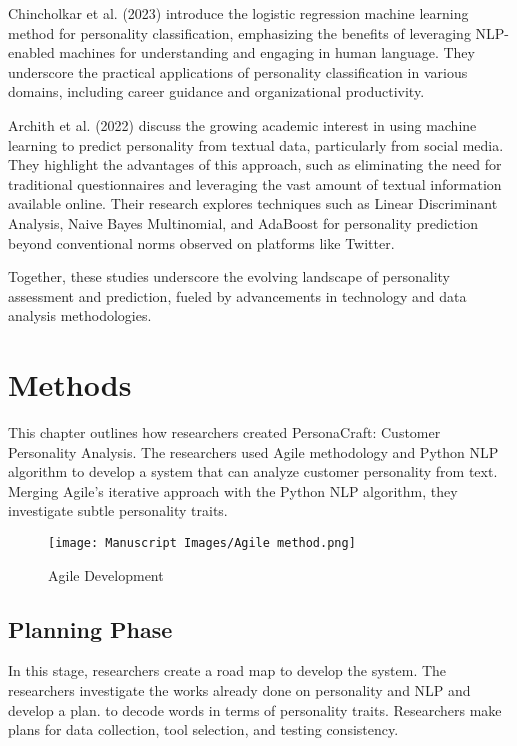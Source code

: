 \documentclass[conference]{IEEEtran}
\begin{document}
    Chincholkar et al. (2023) introduce the logistic regression machine learning method for personality
    classification, emphasizing the benefits of leveraging NLP-enabled machines for understanding
    and engaging in human language. They underscore the practical applications of personality classification
    in various domains, including career guidance and organizational productivity.

    Archith et al. (2022) discuss the growing academic interest in using machine learning to predict
    personality from textual data, particularly from social media. They highlight the advantages of this
    approach, such as eliminating the need for traditional questionnaires and leveraging the vast
    amount of textual information available online. Their research explores techniques such as Linear
    Discriminant Analysis, Naive Bayes Multinomial, and AdaBoost for personality prediction beyond conventional
    norms observed on platforms like Twitter.

    Together, these studies underscore the evolving landscape of personality assessment and
    prediction, fueled by advancements in technology and data analysis methodologies.

    \section{Methods}
    This chapter outlines how researchers created PersonaCraft: Customer Personality Analysis. The researchers
    used Agile methodology and Python NLP algorithm to develop a system that can analyze customer personality
    from text. Merging Agile's iterative approach with the Python NLP algorithm, they investigate subtle
    personality traits.

    \begin{figure}[ht]
        \centering
        \texttt{[image: Manuscript Images/Agile method.png]}
        \caption{Agile Development}
    \end{figure}

    \subsection{Planning Phase}

    In this stage, researchers create a road map to develop the system. The researchers investigate the
    works already done on personality and NLP and develop a plan. to decode words in terms of
    personality traits. Researchers make plans for data collection, tool selection, and testing consistency.
\end{document}
